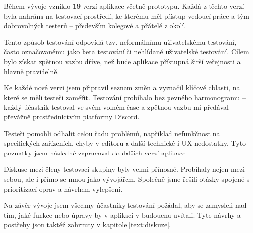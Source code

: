 Během vývoje vzniklo \textbf{19} verzí aplikace včetně prototypu. 
Každá z těchto verzí byla nahrána na testovací prostředí, ke kterému měl přístup vedoucí práce a tým dobrovolných testerů -- především kolegové a přátelé z okolí.

Tento způsob testování odpovídá tzv. neformálnímu uživatelskému testování, často označovanému jako beta testování či nehlídané uživatelské testování. 
Cílem bylo získat zpětnou vazbu dříve, než bude aplikace přístupná širší veřejnosti a hlavně pravidelně.

Ke každé nové verzi jsem připravil seznam změn a vyznačil klíčové oblasti, na které se měli testeři zaměřit. 
Testování probíhalo bez pevného harmonogramu -- každý účastník testoval ve svém volném čase a zpětnou vazbu mi předával převážně prostřednictvím platformy Discord.

Testeři pomohli odhalit celou řadu problémů, například nefunkčnost na specifických zařízeních, chyby v editoru a další technické i UX nedostatky. 
Tyto poznatky jsem následně zapracoval do dalších verzí aplikace.

Diskuse mezi členy testovací skupiny byly velmi přínosné.
Probíhaly nejen mezi sebou, ale i přímo se mnou jako vývojářem. 
Společně jsme řešili otázky spojené s prioritizací oprav a návrhem vylepšení.

Na závěr vývoje jsem všechny účastníky testování požádal, aby se zamysleli nad tím, jaké funkce nebo úpravy by v aplikaci v budoucnu uvítali. 
Tyto návrhy a postřehy jsou taktéž zahrnuty v kapitole \ref{text:diskuze}.






